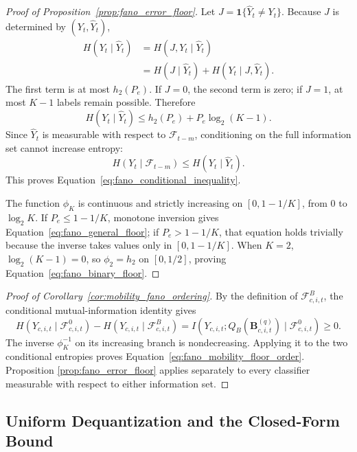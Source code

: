 \begin{proof}[Proof of Proposition~\ref{prop:fano_error_floor}]
Let
\(J=\mathbf{1}\{\widehat{Y}_t\neq Y_t\}\). Because \(J\) is determined by
\((Y_t,\widehat{Y}_t)\),
\begin{align*}
H(Y_t\mid\widehat{Y}_t)
&=
H(J,Y_t\mid\widehat{Y}_t)\\
&=
H(J\mid\widehat{Y}_t)
+
H(Y_t\mid J,\widehat{Y}_t).
\end{align*}
The first term is at most \(h_2(P_e)\). If \(J=0\), the second term is
zero; if \(J=1\), at most \(K-1\) labels remain possible. Therefore
\[
H(Y_t\mid\widehat{Y}_t)
\leq
h_2(P_e)+P_e\log_2(K-1).
\]
Since \(\widehat{Y}_t\) is measurable with respect to
\(\mathcal{F}_{t-m}\), conditioning on the full information set cannot
increase entropy:
\[
H(Y_t\mid\mathcal{F}_{t-m})
\leq
H(Y_t\mid\widehat{Y}_t).
\]
This proves Equation~\eqref{eq:fano_conditional_inequality}.

The function \(\phi_K\) is continuous and strictly increasing on
\([0,1-1/K]\), from \(0\) to \(\log_2K\). If
\(P_e\leq1-1/K\), monotone inversion gives
Equation~\eqref{eq:fano_general_floor}; if
\(P_e>1-1/K\), that equation holds trivially because the inverse takes
values only in \([0,1-1/K]\). When \(K=2\),
\(\log_2(K-1)=0\), so \(\phi_2=h_2\) on \([0,1/2]\), proving
Equation~\eqref{eq:fano_binary_floor}.
\end{proof}

\begin{proof}[Proof of Corollary~\ref{cor:mobility_fano_ordering}]
By the definition of \(\mathcal{F}^{B}_{c,i,t}\), the conditional
mutual-information identity gives
\[
H(Y_{c,i,t}\mid\mathcal{F}^{0}_{c,i,t})
-
H(Y_{c,i,t}\mid\mathcal{F}^{B}_{c,i,t})
=
I\!\left(
Y_{c,i,t};
Q_B(\mathbf{B}^{(q)}_{c,i,t})
\mid\mathcal{F}^{0}_{c,i,t}
\right)
\geq0.
\]
The inverse \(\phi_K^{-1}\) on its increasing branch is nondecreasing.
Applying it to the two conditional entropies proves
Equation~\eqref{eq:fano_mobility_floor_order}. Proposition
\ref{prop:fano_error_floor} applies separately to every classifier
measurable with respect to either information set.
\end{proof}

\subsection{Uniform Dequantization and the Closed-Form Bound}

